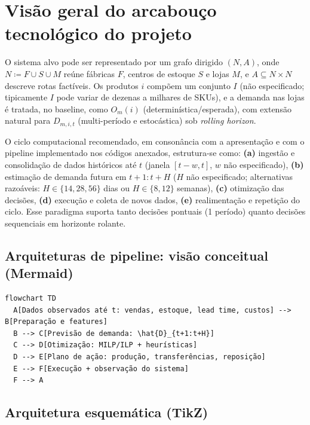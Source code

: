 \section{Visão geral do arcabouço tecnológico do projeto}

O sistema alvo pode ser representado por um grafo dirigido \((N,A)\), onde \(N \coloneqq F \cup S \cup M\) reúne fábricas \(F\), centros de estoque \(S\) e lojas \(M\), e \(A\subseteq N\times N\) descreve rotas factíveis. \cite{AhujaMagnantiOrlin1993NetworkFlows,Shapiro2001ModelingSupplyChain} Os produtos \(i\) compõem um conjunto \(I\) (não especificado; tipicamente \(I\) pode variar de dezenas a milhares de SKUs), e a demanda nas lojas é tratada, no baseline, como \(O_m(i)\) (determinística/esperada), com extensão natural para \(D_{m,i,t}\) (multi-período e estocástica) sob \emph{rolling horizon}. \cite{Axsater2006InventoryControl,BirgeLouveaux2011StochasticProgramming}

O ciclo computacional recomendado, em consonância com a apresentação e com o pipeline implementado nos códigos anexados, estrutura-se como: \textbf{(a)} ingestão e consolidação de dados históricos até \(t\) (janela \([t-w,t]\), \(w\) não especificado), \textbf{(b)} estimação de demanda futura em \(t+1:t+H\) (\(H\) não especificado; alternativas razoáveis: \(H\in\{14,28,56\}\) dias ou \(H\in\{8,12\}\) semanas), \textbf{(c)} otimização das decisões, \textbf{(d)} execução e coleta de novos dados, \textbf{(e)} realimentação e repetição do ciclo. Esse paradigma suporta tanto decisões pontuais (1 período) quanto decisões sequenciais em horizonte rolante. \cite{Law2015SimulationModeling}

\subsection*{Arquiteturas de pipeline: visão conceitual (Mermaid)}

\begin{verbatim}
flowchart TD
  A[Dados observados até t: vendas, estoque, lead time, custos] --> B[Preparação e features]
  B --> C[Previsão de demanda: \hat{D}_{t+1:t+H}]
  C --> D[Otimização: MILP/ILP + heurísticas]
  D --> E[Plano de ação: produção, transferências, reposição]
  E --> F[Execução + observação do sistema]
  F --> A
\end{verbatim}

\subsection*{Arquitetura esquemática (TikZ)}

